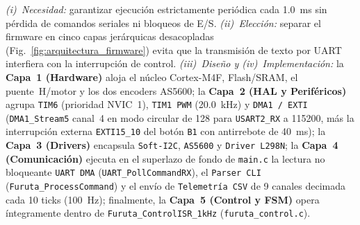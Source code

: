 \textit{(i)~Necesidad:} garantizar ejecución estrictamente periódica cada \qty{1.0}{\milli\second} sin pérdida de comandos seriales ni bloqueos de E/S.
\textit{(ii)~Elección:} separar el firmware en cinco capas jerárquicas desacopladas (Fig.~\ref{fig:arquitectura_firmware}) evita que la transmisión de texto por UART interfiera con la interrupción de control.
\textit{(iii)~Diseño y (iv)~Implementación:} la \textbf{Capa~1 (Hardware)} aloja el núcleo Cortex-M4F, Flash/SRAM, el puente~H/motor y los dos encoders AS5600; la \textbf{Capa~2 (HAL y Periféricos)} agrupa \texttt{TIM6} (prioridad NVIC~1), \texttt{TIM1 PWM} (\qty{20.0}{\kilo\hertz}) y \texttt{DMA1 / EXTI} (\texttt{DMA1\_Stream5} canal~4 en modo circular de \qty{128}{\byte} para \texttt{USART2\_RX} a \qty{115200}{\baud}, más la interrupción externa \texttt{EXTI15\_10} del botón \texttt{B1} con antirrebote de \qty{40}{\milli\second}); la \textbf{Capa~3 (Drivers)} encapsula \texttt{Soft-I2C}, \texttt{AS5600} y \texttt{Driver L298N}; la \textbf{Capa~4 (Comunicación)} ejecuta en el superlazo de fondo de \texttt{main.c} la lectura no bloqueante \texttt{UART DMA} (\texttt{UART\_PollCommandRX}), el \texttt{Parser CLI} (\texttt{Furuta\_ProcessCommand}) y el envío de \texttt{Telemetría CSV} de 9 canales decimada cada 10 ticks (\qty{100}{\hertz}); finalmente, la \textbf{Capa~5 (Control y FSM)} opera íntegramente dentro de \texttt{Furuta\_ControlISR\_1kHz} (\texttt{furuta\_control.c}).

